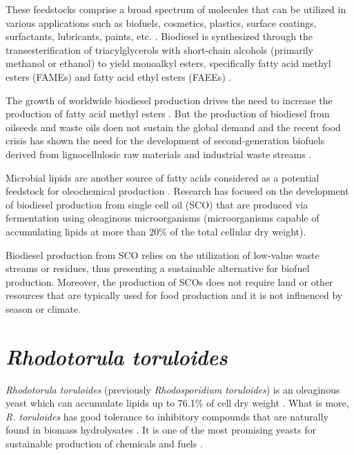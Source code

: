 These feedstocks comprise a broad spectrum of molecules that can be utilized in 
various applications such as biofuels, cosmetics, plastics, 
surface coatings, surfactants, lubricants, paints, etc. \cite{Lopes2020}. Biodiesel is synthesized through the transesterification of triacylglycerols with short-chain alcohols 
(primarily methanol or ethanol) to yield monoalkyl esters, specifically fatty acid methyl esters (FAMEs) 
and fatty acid ethyl esters (FAEEs) \cite{Koutinas2014}.

The growth of worldwide biodiesel production drives the need to increase the 
production of fatty acid methyl esters \cite{Yang2018}. But the production of biodiesel from oilseeds and waste oils doen not sustain the 
global demand \cite{Koutinas2014} and the recent food crisis has shown the 
need for the development of second-generation biofuels derived from 
lignocellulosic raw materials and industrial waste streams \cite{Koutinas2011}.

Microbial lipids are another source of fatty 
acids considered as a potential feedstock for oleochemical production \cite{Unrean2017}. Research has focused on the development 
of biodiesel production from single cell 
oil (SCO) that are produced via fermentation using oleaginous microorganisms (microorganisms 
capable of accumulating lipids at more than 20\% of the total cellular dry weight). 
 
Biodiesel production from SCO relies on the utilization of low-value waste streams 
or residues, thus presenting a sustainable alternative for biofuel production. 
Moreover, the production of SCOs does not require land or other resources that are typically used for food production 
and it is not influenced by season or climate. \cite{Koutinas2014} 


\section{\textit{Rhodotorula toruloides}} %

\textit{Rhodotorula toruloides} (previously \textit{Rhodosporidium toruloides}) is an oleaginous yeast
which can accumulate lipids up to 76.1\% of cell dry weight \cite{Li2007}. 
What is more, \textit{R. toruloides} has good tolerance to inhibitory compounds that are naturally found in biomass hydrolysates \cite{Hu2009}.
It is one of the most promising yeasts for 
sustainable production of chemicals and fuels \cite{Rekena2023}.

